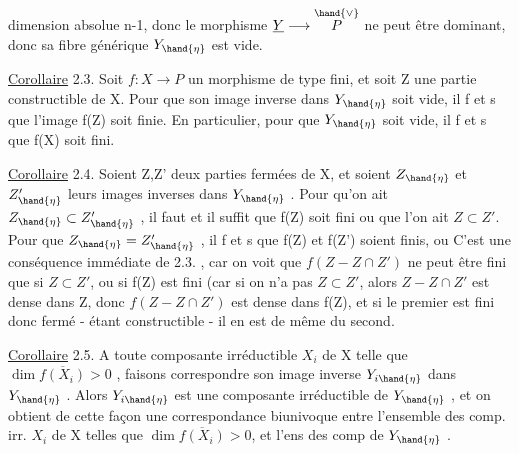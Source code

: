 
dimension absolue n-1, donc le morphisme $\underline{Y}\longrightarrow \overset{\hand{\vee}}{P}$ ne peut être dominant,
donc sa fibre générique $Y_{\hand{\eta}}$ est vide.

\uline{Corollaire} 2.3. Soit $f:X\longrightarrow P$ un morphisme de type fini, et soit Z une
partie constructible de X. Pour que son image inverse dans $Y_{\hand{\eta}}$ soit vide,
il f et s que l'image f(Z) soit finie. En particulier, pour que  $Y_{\hand{\eta}}$ soit
vide, il f et s que f(X) soit fini.

\uline{Corollaire} 2.4. Soient Z,Z' deux parties fermées  de X,
et soient $Z_{\hand{\eta}}$ et $Z'_{\hand{\eta}}$ leurs images inverses dans $Y_{\hand{\eta}}$ . Pour qu'on ait
$Z_{\hand{\eta}}\subset Z'_{\hand{\eta}}$ , il faut et il suffit que f(Z) soit fini ou que l'on ait $Z\subset Z'$.
Pour que $Z_{\hand{\eta}} = Z'_{\hand{\eta}}$ , il f et s que  f(Z) et f(Z') soient finis, ou 
 C'est une conséquence 
 immédiate de 2.3. , car on voit que $f(Z - Z\cap Z')$ ne peut être fini
que si $Z\subset Z'$, ou si f(Z) est fini (car si on n'a pas $Z\subset Z'$, alors $Z-Z\cap Z'$
est dense dans Z, donc $f(Z-Z\cap Z')$ est dense dans f(Z), et si le premier
est fini donc fermé - étant constructible - il en est de même du second.

\uline{Corollaire} 2.5. A toute composante irréductible $X_i$ de X telle que
$\dim \overline{f(X_i)} > 0$ , faisons correspondre  son image inverse $Y_{i\hand{\eta}}$ dans
$Y_{\hand{\eta}}$ . Alors $Y_{i\hand{\eta}}$ est une composante irréductible de $Y_{\hand{\eta}}$ , et on obtient de
cette façon une correspondance biunivoque entre l'ensemble des comp. irr.
$X_i$ de X telles que $\dim \overline{f(X_i)}> 0$, et l'ens des comp  de $Y_{\hand{\eta}}$ .

